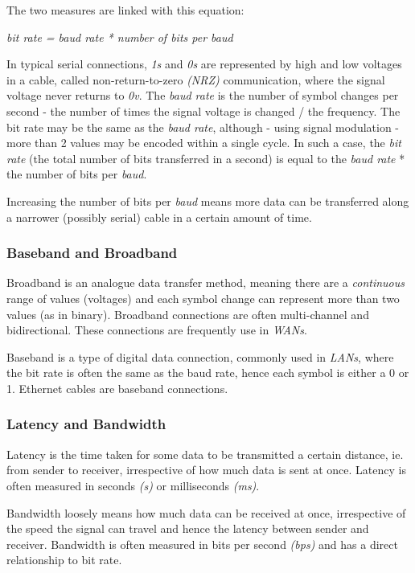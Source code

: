 \documentclass[9pt]{article}
\begin{document}
The two measures are linked with this equation:

\emph{bit rate = baud rate * number of bits per baud}

In typical serial connections, \emph{1s} and \emph{0s} are represented by high and low voltages in a cable, called non-return-to-zero \emph{(NRZ)} communication, where the signal voltage never returns to \emph{0v}. The \emph{baud rate} is the number of symbol changes per second - the number of times the signal voltage is changed / the frequency. The bit rate may be the same as the \emph{baud rate}, although - using signal modulation - more than 2 values may be encoded within a single cycle. In such a case, the \emph{bit rate} (the total number of bits transferred in a second) is equal to the \emph{baud rate} * the number of bits per \emph{baud}.

Increasing the number of bits per \emph{baud} means more data can be transferred along a narrower (possibly serial) cable in a certain amount of time.

\subsubsection{Baseband and Broadband}
\label{sec:org4a89946}

Broadband is an analogue data transfer method, meaning there are a \emph{continuous} range of values (voltages) and each symbol change can represent more than two values (as in binary). Broadband connections are often multi-channel and bidirectional. These connections are frequently use in \emph{WANs}.

Baseband is a type of digital data connection, commonly used in \emph{LANs}, where the bit rate is often the same as the baud rate, hence each symbol is either a 0 or 1. Ethernet cables are baseband connections.

\subsubsection{Latency and Bandwidth}
\label{sec:orgf8c0882}

Latency is the time taken for some data to be transmitted a certain distance, ie. from sender to receiver, irrespective of how much data is sent at once. Latency is often measured in seconds \emph{(s)} or milliseconds \emph{(ms)}.

Bandwidth loosely means how much data can be received at once, irrespective of the speed the signal can travel and hence the latency between sender and receiver. Bandwidth is often measured in bits per second \emph{(bps)} and has a direct relationship to bit rate.
\end{document}

